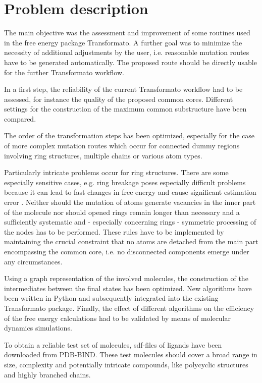 \chapter{Problem description }

The main objective was the assessment and improvement of some routines
used in the free energy package Transformato. A further goal was to
minimize the necessity of additional adjustments by the user, i.e.
reasonable mutation routes have to be generated automatically. The
proposed route should be directly usable for the further Transformato
workflow.

In a first step, the reliability of the current Transformato workflow
had to be assessed, for instance the quality of the proposed common
cores. Different settings for the construction of the maximum common
substructure have been compared. 

The order of the transformation steps has been optimized, especially
for the case of more complex mutation routes which occur for connected
dummy regions involving ring structures, multiple chains or various
atom types. 

Particularly intricate problems occur for ring structures. There are
some especially sensitive cases, e.g. ring breakage poses especially
difficult problems because it can lead to fast changes in free energy
and cause significant estimation error \cite{Liu.2015}. Neither should
the mutation of atoms generate vacancies in the inner part of the
molecule nor should opened rings remain longer than necessary and
a sufficiently systematic and - especially concerning rings - symmetric
processing of the nodes has to be performed. These rules have to be
implemented by maintaining the crucial constraint that no atoms are
detached from the main part encompassing the common core, i.e. no
disconnected components emerge under any circumstances.

Using a graph representation of the involved molecules, the construction
of the intermediates between the final states has been optimized.
New algorithms have been written in Python and subsequently integrated
into the existing Transformato package. Finally, the effect of different
algorithms on the efficiency of the free energy calculations had to
be validated by means of molecular dynamics simulations. 

To obtain a reliable test set of molecules, sdf-files of ligands have
been downloaded from PDB-BIND. These test molecules should cover a
broad range in size, complexity and potentially intricate compounds,
like polycyclic structures and highly branched chains.

